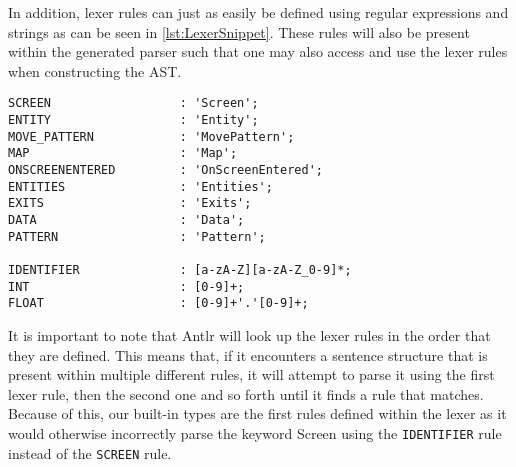 In addition, lexer rules can just as easily be defined using regular expressions and strings as can be seen in \ref{lst:LexerSnippet}.
These rules will also be present within the generated parser such that one may also access and use the lexer rules when constructing the AST. 

\begin{lstlisting}[caption={A snippet of few lexer rules for \dazel{}.}, label={lst:LexerSnippet},escapechar=|]
SCREEN                  : 'Screen';
ENTITY                  : 'Entity';
MOVE_PATTERN            : 'MovePattern';
MAP                     : 'Map';
ONSCREENENTERED         : 'OnScreenEntered';
ENTITIES                : 'Entities';
EXITS                   : 'Exits';
DATA                    : 'Data';
PATTERN                 : 'Pattern';

IDENTIFIER              : [a-zA-Z][a-zA-Z_0-9]*;
INT                     : [0-9]+;
FLOAT                   : [0-9]+'.'[0-9]+;	
\end{lstlisting}

It is important to note that Antlr will look up the lexer rules in the order that they are defined. 
This means that, if it encounters a sentence structure that is present within multiple different rules, it will attempt to parse it using the first lexer rule, then the second one and so forth until it finds a rule that matches. 
Because of this, our built-in types are the first rules defined within the lexer as it would otherwise incorrectly parse the keyword Screen using the \texttt{IDENTIFIER} rule instead of the \texttt{SCREEN} rule\cite{parrDefinitiveANTLRReference2012}.
